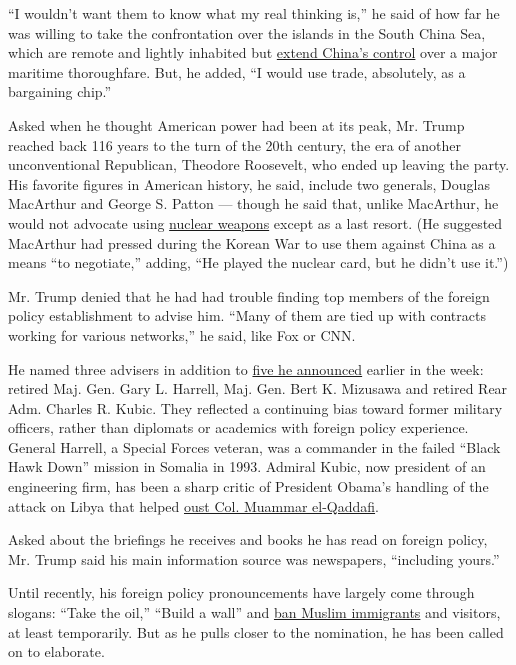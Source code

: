 ``I wouldn't want them to know what my real thinking is,'' he said of
how far he was willing to take the confrontation over the islands in the
South China Sea, which are remote and lightly inhabited but
\href{http://www.nytimes3xbfgragh.onion/2016/03/09/world/asia/south-china-sea-militarization.html}{extend
China's control} over a major maritime thoroughfare. But, he added, ``I
would use trade, absolutely, as a bargaining chip.''

Asked when he thought American power had been at its peak, Mr. Trump
reached back 116 years to the turn of the 20th century, the era of
another unconventional Republican, Theodore Roosevelt, who ended up
leaving the party. His favorite figures in American history, he said,
include two generals, Douglas MacArthur and George S. Patton --- though
he said that, unlike MacArthur, he would not advocate using
\href{http://topics.nytimes3xbfgragh.onion/top/news/science/topics/atomic_weapons/index.html?inline=nyt-classifier}{nuclear
weapons} except as a last resort. (He suggested MacArthur had pressed
during the Korean War to use them against China as a means ``to
negotiate,'' adding, ``He played the nuclear card, but he didn't use
it.'')

Mr. Trump denied that he had had trouble finding top members of the
foreign policy establishment to advise him. ``Many of them are tied up
with contracts working for various networks,'' he said, like Fox or CNN.

He named three advisers in addition to
\href{http://www.nytimes3xbfgragh.onion/2016/03/23/us/politics/donald-trump-foreign-policy-advisers.html}{five
he announced} earlier in the week: retired Maj. Gen. Gary L. Harrell,
Maj. Gen. Bert K. Mizusawa and retired Rear Adm. Charles R. Kubic. They
reflected a continuing bias toward former military officers, rather than
diplomats or academics with foreign policy experience. General Harrell,
a Special Forces veteran, was a commander in the failed ``Black Hawk
Down'' mission in Somalia in 1993. Admiral Kubic, now president of an
engineering firm, has been a sharp critic of President Obama's handling
of the attack on Libya that helped
\href{http://www.nytimes3xbfgragh.onion/2011/10/21/world/africa/qaddafi-killed-as-hometown-falls-to-libyan-rebels.html}{oust
Col. Muammar el-Qaddafi}.

Asked about the briefings he receives and books he has read on foreign
policy, Mr. Trump said his main information source was newspapers,
``including yours.''

Until recently, his foreign policy pronouncements have largely come
through slogans: ``Take the oil,'' ``Build a wall'' and
\href{http://www.nytimes3xbfgragh.onion/politics/first-draft/2015/12/07/donald-trump-calls-for-banning-muslims-from-entering-u-s/}{ban
Muslim immigrants} and visitors, at least temporarily. But as he pulls
closer to the nomination, he has been called on to elaborate.

